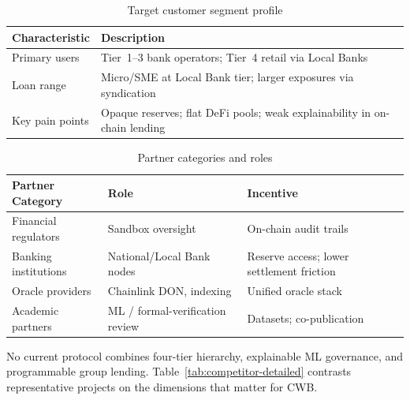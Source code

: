 \documentclass[12pt, a4paper]{report}
\newcommand{\tableheadcolor}{\rowcolor{TableHeadBg}}
\begin{document}
\vspace{2pt}

\begin{table}[H]
\centering
\caption[Target customer segment profile]{Target customer segment profile}
\label{tab:customer-segment-ch5}
\begin{tabular}{p{3.5cm}p{10cm}}
\toprule
\tableheadcolor
\textbf{Characteristic} & \textbf{Description} \\
\midrule
Primary users & Tier~1--3 bank operators; Tier~4 retail via Local Banks \\
Loan range & Micro/SME at Local Bank tier; larger exposures via syndication \\
Key pain points & Opaque reserves; flat DeFi pools; weak explainability in on-chain lending \\
\bottomrule
\end{tabular}
\end{table}

\vspace{2pt}

\begin{table}[H]
\centering
\caption[Partner categories and roles]{Partner categories and roles}
\label{tab:partner-categories-ch5}
\begin{tabular}{p{3.5cm}p{4.5cm}p{5.5cm}}
\toprule
\tableheadcolor
\textbf{Partner Category} & \textbf{Role} & \textbf{Incentive} \\
\midrule
Financial regulators & Sandbox oversight & On-chain audit trails \\
Banking institutions & National/Local Bank nodes & Reserve access; lower settlement friction \\
Oracle providers & Chainlink DON, indexing & Unified oracle stack \\
Academic partners & ML / formal-verification review & Datasets; co-publication \\
\bottomrule
\end{tabular}
\end{table}

\vspace{2pt}

No current protocol combines four-tier hierarchy, explainable ML governance, and programmable group lending. Table~\ref{tab:competitor-detailed} contrasts representative projects on the dimensions that matter for CWB.
\end{document}
